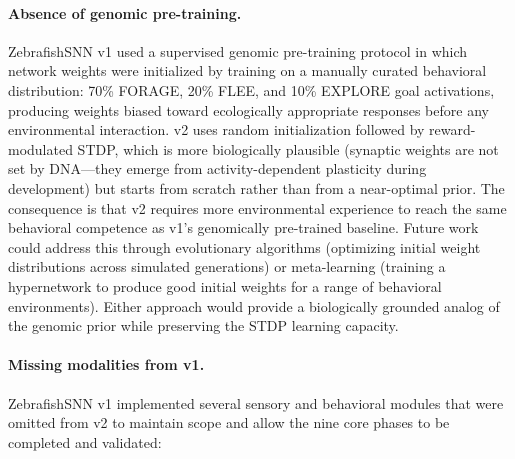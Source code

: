\documentclass[11pt,a4paper]{article}
\begin{document}
\paragraph{Absence of genomic pre-training.}
ZebrafishSNN v1 used a supervised genomic pre-training protocol
in which network weights were initialized by training on a
manually curated behavioral distribution:
70\% FORAGE, 20\% FLEE, and 10\% EXPLORE goal activations,
producing weights biased toward ecologically appropriate responses
before any environmental interaction.
v2 uses random initialization followed by reward-modulated STDP,
which is more biologically plausible (synaptic weights are not
set by DNA---they emerge from activity-dependent plasticity during
development) but starts from scratch rather than from a near-optimal
prior.
The consequence is that v2 requires more environmental experience
to reach the same behavioral competence as v1's genomically
pre-trained baseline.
Future work could address this through evolutionary algorithms
(optimizing initial weight distributions across simulated generations)
or meta-learning (training a hypernetwork to produce good initial
weights for a range of behavioral environments).
Either approach would provide a biologically grounded analog of
the genomic prior while preserving the STDP learning capacity.

\paragraph{Missing modalities from v1.}
ZebrafishSNN v1 implemented several sensory and behavioral
modules that were omitted from v2 to maintain scope and allow
the nine core phases to be completed and validated:
\end{document}
